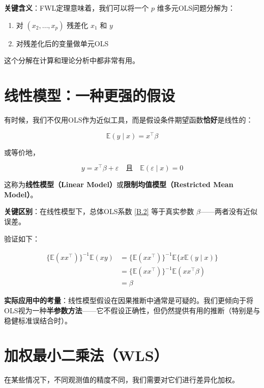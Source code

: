 \textbf{关键含义}：FWL定理意味着，我们可以将一个 $p$ 维多元OLS问题分解为：
\begin{enumerate}
  \item 对 $(x_2, \ldots, x_p)$ 残差化 $x_1$ 和 $y$
  \item 对残差化后的变量做单元OLS
\end{enumerate}

这个分解在计算和理论分析中都非常有用。


\section{线性模型：一种更强的假设}\label{sec:B-linear-model}

有时候，我们不仅用OLS作为近似工具，而是假设条件期望函数\textbf{恰好}是线性的：

\[
\mathbb{E}(y \mid x) = x^\top \beta
\tag{B.18}
\]

或等价地，

\[
y = x^\top \beta + \varepsilon \quad \text{且} \quad \mathbb{E}(\varepsilon \mid x) = 0
\tag{B.19}
\]

这称为\textbf{线性模型（Linear Model）}或\textbf{限制均值模型（Restricted Mean Model）}。

\textbf{关键区别}：在线性模型下，总体OLS系数 \cref{B.2} 等于真实参数 $\beta$——两者没有近似误差。

验证如下：

\[
\begin{aligned}
\{ \mathbb{E}(x x^\top) \}^{-1} \mathbb{E}(x y)
&= \{ \mathbb{E}(x x^\top) \}^{-1} \mathbb{E}\{x \mathbb{E}(y \mid x)\} \\
&= \{ \mathbb{E}(x x^\top) \}^{-1} \mathbb{E}(x x^\top \beta) \\
&= \beta
\end{aligned}
\tag{B.20}
\]

\textbf{实际应用中的考量}：线性模型假设在因果推断中通常是可疑的。我们更倾向于将OLS视为一种\textbf{半参数方法}——它不假设正确性，但仍然提供有用的推断（特别是与稳健标准误结合时）。

\section{加权最小二乘法（WLS）}\label{sec:B-wls}

在某些情况下，不同观测值的精度不同，我们需要对它们进行差异化加权。

